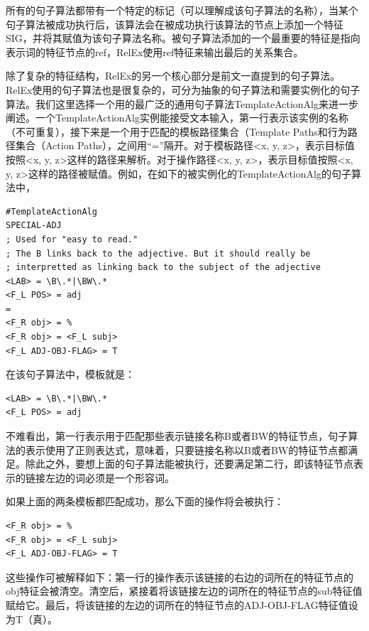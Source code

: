 所有的句子算法都带有一个特定的标记（可以理解成该句子算法的名称），当某个句子算法被成功执行后，该算法会在被成功执行该算法的节点上添加一个特征SIG，并将其赋值为该句子算法名称。被句子算法添加的一个最重要的特征是指向表示词的特征节点的ref，RelEx使用ref特征来输出最后的关系集合。

除了复杂的特征结构，RelEx的另一个核心部分是前文一直提到的句子算法。RelEx使用的句子算法也是很复杂的，可分为抽象的句子算法和需要实例化的句子算法。我们这里选择一个用的最广泛的通用句子算法TemplateActionAlg来进一步阐述。一个TemplateActionAlg实例能接受文本输入，第一行表示该实例的名称（不可重复），接下来是一个用于匹配的模板路径集合（Template Paths和行为路径集合（Action Paths），之间用“=”隔开。对于模板路径\textless x, y, z\textgreater ，表示目标值按照\textless x, y, z\textgreater 这样的路径来解析。对于操作路径\textless x, y, z\textgreater ，表示目标值按照\textless x, y, z\textgreater 这样的路径被赋值。例如，在如下的被实例化的TemplateActionAlg的句子算法中，

\begin{verbatim}
#TemplateActionAlg
SPECIAL-ADJ
; Used for "easy to read." 
; The B links back to the adjective. But it should really be
; interpretted as linking back to the subject of the adjective
<LAB> = \B\.*|\BW\.*
<F_L POS> = adj
=
<F_R obj> = %
<F_R obj> = <F_L subj>
<F_L ADJ-OBJ-FLAG> = T
\end{verbatim}

在该句子算法中，模板就是：

\begin{verbatim}
<LAB> = \B\.*|\BW\.*
<F_L POS> = adj
\end{verbatim}

不难看出，第一行表示用于匹配那些表示链接名称B或者BW的特征节点，句子算法的表示使用了正则表达式，意味着，只要链接名称以B或者BW的特征节点都满足。除此之外，要想上面的句子算法能被执行，还要满足第二行，即该特征节点表示的链接左边的词必须是一个形容词。

如果上面的两条模板都匹配成功，那么下面的操作将会被执行：

\begin{verbatim}
<F_R obj> = %
<F_R obj> = <F_L subj>
<F_L ADJ-OBJ-FLAG> = T
\end{verbatim}

这些操作可被解释如下：第一行的操作表示该链接的右边的词所在的特征节点的obj特征会被清空。清空后，紧接着将该链接左边的词所在的特征节点的sub特征值赋给它。最后，将该链接的左边的词所在的特征节点的ADJ-OBJ-FLAG特征值设为T（真）。

